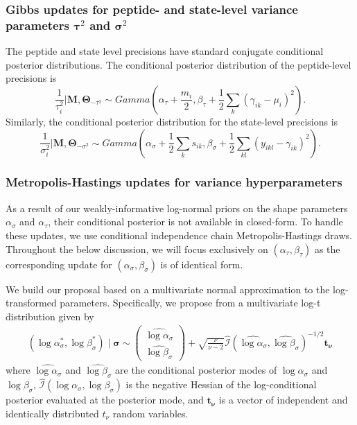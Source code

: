 \subsubsection{Gibbs updates for peptide- and state-level variance parameters $\bm \tau^2$ and $\bm \sigma^2$}

The peptide and state level precisions have standard conjugate conditional posterior distributions.
The conditional posterior distribution of the peptide-level precisions is 
\begin{equation*}
\frac{1}{\tau_{i}^{2}} | \bm M, \bm \Theta_{-\tau^2} \sim Gamma\left(\alpha_{\tau}+\frac{m_{i}}{2},\beta_{\tau}+\frac{1}{2}\sum_{k}(\gamma_{ik}-\mu_{i})^{2}\right) .
\end{equation*}
Similarly, the conditional posterior distribution for the state-level precisions is
\begin{equation*}
\frac{1}{\sigma_{i}^{2}} | \bm M, \bm \Theta_{-\sigma^2}  \sim Gamma\left(\alpha_{\sigma}+\frac{1}{2}\sum_{k}s_{ik},\beta_{\sigma}+\frac{1}{2}\sum_{kl}(y_{ikl}-\gamma_{ik})^{2}\right) .
\end{equation*}

\subsubsection{Metropolis-Hastings updates for variance hyperparameters}
\label{supp:proteomics:sec:var_hyperparam_updates}

As a result of our weakly-informative log-normal priors on the shape parameters $\alpha_\sigma$ and $\alpha_\tau$, their conditional posterior is not available in closed-form.
To handle these updates, we use conditional independence chain Metropolis-Hastings draws.
Throughout the below discussion, we will focus exclusively on $(\alpha_\tau, \beta_\tau)$ as the corresponding update for $(\alpha_\sigma, \beta_\sigma)$ is of identical form.

We build our proposal based on a multivariate normal approximation to the log-transformed parameters.
Specifically, we propose from a multivariate log-t distribution given by
\begin{eqnarray}
(\log \alpha_{\sigma}^*, \log \beta_{\sigma}^*) \mid \bm{\sigma} \sim \left(\begin{array}{c}
\widehat{\log\alpha_{\sigma}} \\
\widehat{\log\beta_{\sigma}}
\end{array}\right) +
\sqrt{\frac{\nu}{\nu - 2}} \hat{\mathcal{I}}(\widehat{\log\alpha_{\sigma}},\widehat{\log\beta_{\sigma}})^{-1/2} \bm{t_{\nu}} \label{supp:proteomics:eqn:alpha_and_beta_sigma_multivar_log_normal_prop}
\end{eqnarray}
where $\widehat{\log\alpha_{\sigma}}$ and $\widehat{\log\beta_{\sigma}}$ are the conditional posterior modes of $\log\alpha_{\sigma}$ and $\log\beta_\sigma$, $\hat{\mathcal{I}}(\log\alpha_\sigma,\log\beta_\sigma)$ is the negative Hessian of the log-conditional posterior evaluated at the posterior mode, and $\bm{t_{\nu}}$ is a vector of independent and identically distributed $t_{\nu}$ random variables.

